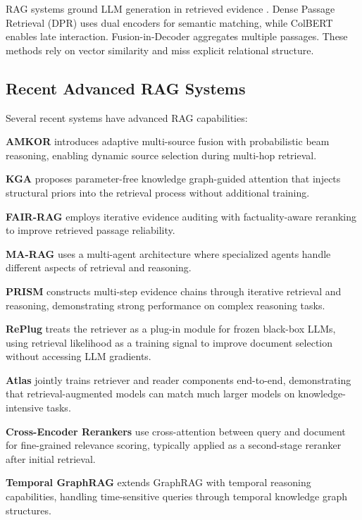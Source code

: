 \documentclass[10pt,twocolumn]{article}
\begin{document}
RAG systems ground LLM generation in retrieved evidence \cite{lewis2020rag}. Dense Passage Retrieval (DPR) \cite{karpukhin2020dpr} uses dual encoders for semantic matching, while ColBERT \cite{khattab2020colbert} enables late interaction. Fusion-in-Decoder \cite{izacard2021fid} aggregates multiple passages. These methods rely on vector similarity and miss explicit relational structure.

\subsection{Recent Advanced RAG Systems}
\label{sec:recent_rag}

Several recent systems have advanced RAG capabilities:

\textbf{AMKOR} \cite{fang2024amkor} introduces adaptive multi-source fusion with probabilistic beam reasoning, enabling dynamic source selection during multi-hop retrieval.

\textbf{KGA} \cite{wang2024kga} proposes parameter-free knowledge graph-guided attention that injects structural priors into the retrieval process without additional training.

\textbf{FAIR-RAG} \cite{chen2024fairrag} employs iterative evidence auditing with factuality-aware reranking to improve retrieved passage reliability.

\textbf{MA-RAG} \cite{li2024marag} uses a multi-agent architecture where specialized agents handle different aspects of retrieval and reasoning.

\textbf{PRISM} \cite{chen2024prism} constructs multi-step evidence chains through iterative retrieval and reasoning, demonstrating strong performance on complex reasoning tasks.

\textbf{RePlug} \cite{shi2024replug} treats the retriever as a plug-in module for frozen black-box LLMs, using retrieval likelihood as a training signal to improve document selection without accessing LLM gradients.

\textbf{Atlas} \cite{izacard2023atlas} jointly trains retriever and reader components end-to-end, demonstrating that retrieval-augmented models can match much larger models on knowledge-intensive tasks.

\textbf{Cross-Encoder Rerankers} \cite{nogueira2019passage} use cross-attention between query and document for fine-grained relevance scoring, typically applied as a second-stage reranker after initial retrieval.

\textbf{Temporal GraphRAG} \cite{lee2024temporalgraphrag} extends GraphRAG with temporal reasoning capabilities, handling time-sensitive queries through temporal knowledge graph structures.
\end{document}
